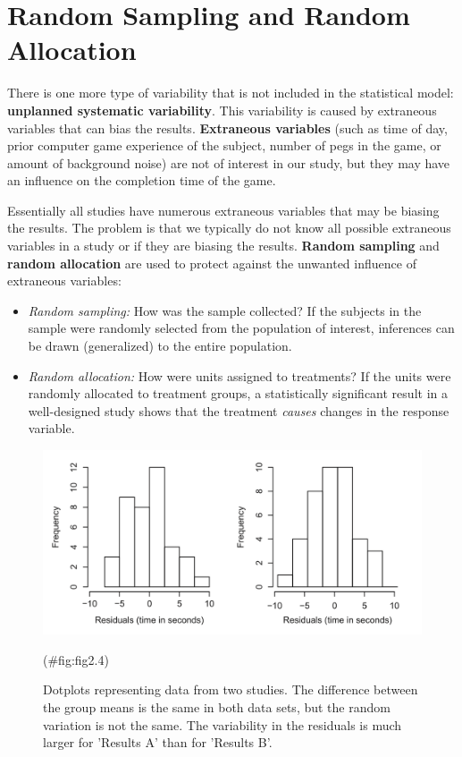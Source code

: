 \documentclass[
]{report}
\begin{document}
\section{\texorpdfstring{\textbf{Random Sampling and Random Allocation}}{Random Sampling and Random Allocation}}\label{random-sampling-and-random-allocation}

There is one more type of variability that is not included in the statistical model: \textbf{unplanned systematic variability}. This variability is caused by extraneous variables that can bias the results. \textbf{Extraneous variables} (such as time of day, prior computer game experience of the subject, number of pegs in the game, or amount of background noise) are not of interest in our study, but they may have an influence on the completion time of the game.

Essentially all studies have numerous extraneous variables that may be biasing the results. The problem is that we typically do not know all possible extraneous variables in a study or if they are biasing the results. \textbf{Random sampling} and \textbf{random allocation} are used to protect against the unwanted influence of extraneous variables:

\begin{itemize}
\item
  \emph{Random sampling:} How was the sample collected? If the subjects in the sample were randomly selected from the population of interest, inferences can be drawn (generalized) to the entire population.
\item
  \emph{Random allocation:} How were units assigned to treatments? If the units were randomly allocated to treatment groups, a statistically significant result in a well-designed study shows that the treatment \emph{causes} changes in the response variable.
\end{itemize}

\begin{figure}

{\centering \includegraphics[width=1\linewidth]{docs/Fig2_4} 

}

\caption{Dotplots representing data from two studies. The difference between the group means is the same in both data sets, but the random variation is not the same. The variability in the residuals is much larger for 'Results A' than for 'Results B'.}(\#fig:fig2.4)
\end{figure}
\end{document}

